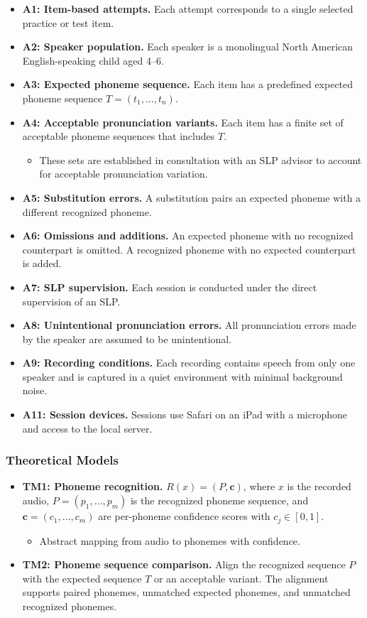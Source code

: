 \documentclass[12pt]{article}
\begin{document}
\begin{itemize}
\item \textbf{A1: Item-based attempts.} Each attempt corresponds to a single selected practice or test item.
\item \textbf{A2: Speaker population.} Each speaker is a monolingual North American English-speaking child aged 4--6.
\item \textbf{A3: Expected phoneme sequence.} Each item has a predefined expected phoneme sequence $T = (t_1, \ldots, t_n)$.
\item \textbf{A4: Acceptable pronunciation variants.} Each item has a finite set of acceptable phoneme sequences that includes $T$.
  \begin{itemize}
  \item These sets are established in consultation with an SLP advisor to account for acceptable pronunciation variation.
  \end{itemize}
\item \textbf{A5: Substitution errors.} A substitution pairs an expected phoneme with a different recognized phoneme.
\item \textbf{A6: Omissions and additions.} An expected phoneme with no recognized counterpart is omitted. A recognized phoneme with no expected counterpart is added.
\item \textbf{A7: SLP supervision.} Each session is conducted under the direct supervision of an SLP.
\item \textbf{A8: Unintentional pronunciation errors.} All pronunciation errors made by the speaker are assumed to be unintentional.
\item \textbf{A9: Recording conditions.} Each recording contains speech from only one speaker and is captured in a quiet environment with minimal background noise.
\item \textbf{A11: Session devices.} Sessions use Safari on an iPad with a microphone and access to the local server.
\end{itemize}

\subsubsection{Theoretical Models}

\begin{itemize}
\item \textbf{TM1: Phoneme recognition.} $R(x) = (P, \mathbf{c})$, where $x$ is the recorded audio, $P = (p_1, \ldots, p_m)$ is the recognized phoneme sequence, and $\mathbf{c} = (c_1, \ldots, c_m)$ are per-phoneme confidence scores with $c_j \in [0, 1]$.
  \begin{itemize}
  \item Abstract mapping from audio to phonemes with confidence.
  \end{itemize}
\item \textbf{TM2: Phoneme sequence comparison.} Align the recognized sequence $P$ with the expected sequence $T$ or an acceptable variant. The alignment supports paired phonemes, unmatched expected phonemes, and unmatched recognized phonemes.
\end{itemize}
\end{document}

